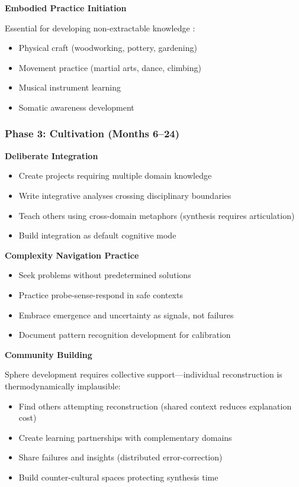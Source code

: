 \textbf{Embodied Practice Initiation}

Essential for developing non-extractable knowledge \citep{collins2010}:
\begin{itemize}
\item Physical craft (woodworking, pottery, gardening)
\item Movement practice (martial arts, dance, climbing)
\item Musical instrument learning
\item Somatic awareness development
\end{itemize}

\subsubsection{Phase 3: Cultivation (Months 6--24)}

\textbf{Deliberate Integration}
\begin{itemize}
\item Create projects requiring multiple domain knowledge
\item Write integrative analyses crossing disciplinary boundaries
\item Teach others using cross-domain metaphors (synthesis requires articulation)
\item Build integration as default cognitive mode
\end{itemize}

\textbf{Complexity Navigation Practice}
\begin{itemize}
\item Seek problems without predetermined solutions
\item Practice probe-sense-respond in safe contexts
\item Embrace emergence and uncertainty as signals, not failures
\item Document pattern recognition development for calibration
\end{itemize}

\textbf{Community Building}

Sphere development requires collective support---individual reconstruction is thermodynamically implausible:
\begin{itemize}
\item Find others attempting reconstruction (shared context reduces explanation cost)
\item Create learning partnerships with complementary domains
\item Share failures and insights (distributed error-correction)
\item Build counter-cultural spaces protecting synthesis time
\end{itemize}

